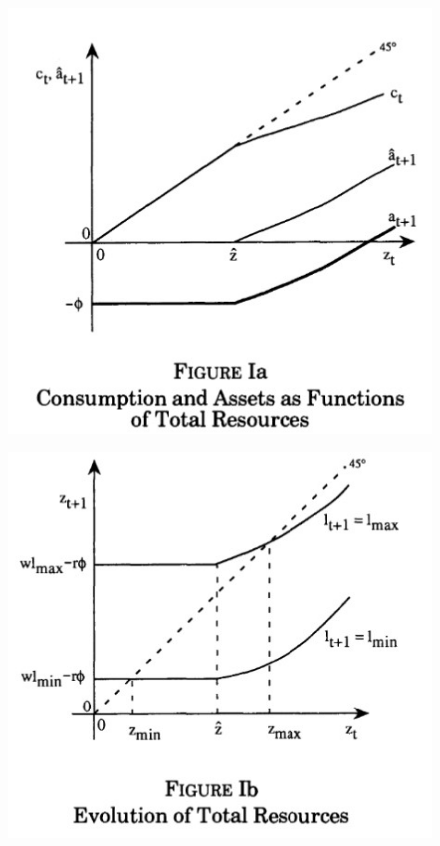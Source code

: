 \documentclass[12pt]{article}
\theoremstyle{definition}
\begin{document}
\begin{figure}
	\centering
	\begin{minipage}{.5\linewidth}
		\caption{}	
		\includegraphics{figIa.jpg}
		\label{figIa} 
		
	\end{minipage}
	\begin{minipage}{.45\linewidth}
		\caption{}
		\includegraphics{figIb.jpg}
		\label{figIb}
		
	\end{minipage}
\end{figure}
\end{document}
